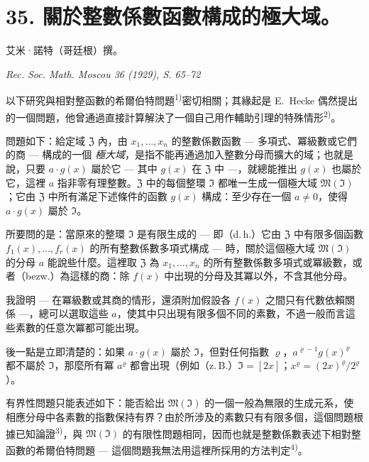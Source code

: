 \documentclass[11pt]{article}
\begin{document}
\setcounter{footnote}{0}

\section*{35. 關於整數係數函數構成的極大域。}

\begin{center}
艾米·諾特（哥廷根）撰。\par
\emph{Rec. Soc. Math. Moscou 36 (1929), S. 65--72}
\end{center}




以下研究與相對整函數的希爾伯特問題\textsuperscript{1)}密切相關；其緣起是 E.\ Hecke 偶然提出的一個問題，他曾通過直接計算解決了一個自己用作輔助引理的特殊情形\textsuperscript{2)}。

問題如下：給定域 $\mathfrak{Z}$ 內，由 $x_1,\ldots,x_n$ 的整數係數函數 --- 多項式、冪級數或它們的商 --- 構成的一個 \textit{極大域}，是指不能再通過加入整數分母而擴大的域；也就是說，只要 $a \cdot g(x)$ 屬於它 --- 其中 $g(x)$ 在 $\mathfrak{Z}$ 中 ---，就總能推出 $g(x)$ 也屬於它，這裡 $a$ 指非零有理整數。$\mathfrak{Z}$ 中的每個整環 $\mathfrak{I}$ 都唯一生成一個極大域 $\mathfrak{M}(\mathfrak{I})$；它由 $\mathfrak{Z}$ 中所有滿足下述條件的函數 $g(x)$ 構成：至少存在一個 $a \neq 0$，使得 $a \cdot g(x)$ 屬於 $\mathfrak{I}$。

所要問的是：當原來的整環 $\mathfrak{I}$ 是有限生成的 --- 即（d.\,h.）它由 $\mathfrak{Z}$ 中有限多個函數 $f_1(x),\ldots,f_r(x)$ 的所有整數係數多項式構成 --- 時，關於這個極大域 $\mathfrak{M}(\mathfrak{I})$ 的分母 $a$ 能說些什麼。這裡取 $\mathfrak{Z}$ 為 $x_1,\ldots,x_n$ 的所有整數係數多項式或冪級數，或者（bezw.）為這樣的商：除 $f(x)$ 中出現的分母及其冪以外，不含其他分母。

我證明 --- 在冪級數或其商的情形，還須附加假設各 $f(x)$ 之間只有代數依賴關係 ---，總可以選取這些 $a$，使其中只出現有限多個不同的素數，不過一般而言這些素數的任意次冪都可能出現。

後一點是立即清楚的：如果 $a\cdot g(x)$ 屬於 $\mathfrak{I}$，但對任何指數 $\varrho$，$a^{\varrho-1}g(x)^{\varrho}$ 都不屬於 $\mathfrak{I}$，那麼所有冪 $a^{\varrho}$ 都會出現（例如（z.\,B.）$\mathfrak{I}=[2x]$；$x^{\varrho}=(2x)^{\varrho}/2^{\varrho}$）。

有界性問題只能表述如下：能否給出 $\mathfrak{M}(\mathfrak{I})$ 的一個一般為無限的生成元系，使相應分母中各素數的指數保持有界？由於所涉及的素數只有有限多個，這個問題根據已知論證\textsuperscript{3)}，與 $\mathfrak{M}(\mathfrak{I})$ 的有限性問題相同，因而也就是整數係數表述下相對整函數的希爾伯特問題 --- 這個問題我無法用這裡所採用的方法判定\textsuperscript{4)}。
\end{document}
